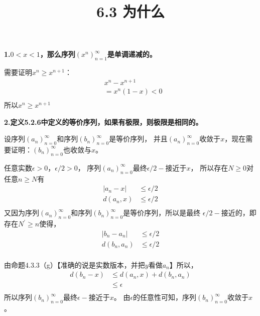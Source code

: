 \documentclass{article}
\theoremstyle{mystyle}
\begin{document}
\title{6.3 为什么}
\maketitle

\textbf{1.$0<x<1$，那么序列$(x^n)_{n=1}^\infty$是单调递减的。}

需要证明$x^n \geq x^{n+1}$：
\begin{align*}
   & x^n - x^{n+1}      \\
   & = x^n(1-x)     < 0 \\
\end{align*}
所以$x^n \geq x^{n+1}$

\textbf{2.定义5.2.6中定义的等价序列，如果有极限，则极限是相同的。}

设序列$(a_n)_{n=0}^\infty$和序列$(b_n)_{n=0}^\infty$是等价序列，
并且$(a_n)_{n=0}^\infty$收敛于$x$，现在需要证明：$(b_n)_{n=0}^\infty$也收敛与$x$。

任意实数$\epsilon > 0$，$\epsilon/2 > 0$，
序列$(a_n)_{n=0}^\infty$最终$\epsilon/2 -$接近于$x$，
所以存在$N \geq 0$对任意$n \geq N$有
\begin{align*}
  |a_n - x| & \leq \epsilon / 2 \\
  d(a_n, x) & \leq \epsilon / 2 \\
\end{align*}
又因为序列$(a_n)_{n=0}^\infty$和序列$(b_n)_{n=0}^\infty$是等价序列，所以是最终
$\epsilon/2 -$接近的，即存在$N^\prime \geq n$使得，
\begin{align*}
  |b_n - a_n| & \leq \epsilon/2 \\
  d(b_n, a_n) & \leq \epsilon/2 \\
\end{align*}

由命题4.3.3（g）【准确的说是实数版本，并把$y$看做$a_n$】所以，
\begin{align*}
  d(b_n - x) & \leq d(a_n, x) + d(b_n, a_n) \\
             & \leq \epsilon                \\
\end{align*}
所以序列$(b_n)_{n=0}^\infty$最终$\epsilon -$接近于$x$。
由$\epsilon$的任意性可知，序列$(b_n)_{n=0}^\infty$收敛于$x$。
\end{document}
